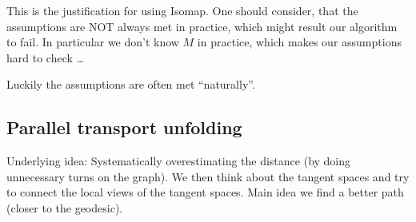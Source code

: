 \begin{aremark}
    This is the justification for using Isomap. One should consider, that the assumptions are NOT always met in practice, which might result our algorithm to fail. In particular we don't know 
    $M$ in practice, which makes our assumptions hard to check \dots

    Luckily the assumptions are often met ``naturally''.
\end{aremark}

\subsection{Parallel transport unfolding}

Underlying idea: %
Systematically overestimating the distance (by doing unnecessary turns on the graph). We then think about the tangent spaces and try to 
connect the local views of the tangent spaces. Main idea we find a better path (closer to the geodesic).


